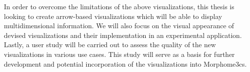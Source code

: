 In order to overcome the limitations of the above visualizations, this thesis is looking to create arrow-based visualizations which will be able to display multidimensional information. We will also focus on the visual appearance of devised visualizations and their implementation in an experimental application. Lastly, a user study will be carried out to assess the quality of the new visualizations in various use cases. This study will serve as a basis for further development and potential incorporation of the visualizations into Morphome3cs.
